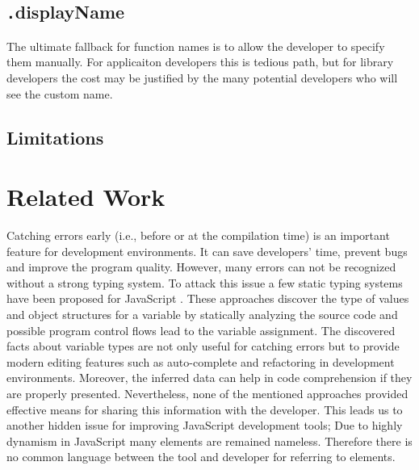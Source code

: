 \documentclass[10pt, preprint]{sigplanconf}
\begin{document}
{\subsection{ {\texttt .displayName} }
The ultimate fallback for function names is to allow the developer to specify them manually. For applicaiton developers this is tedious path, but for library developers the cost may be justified by the many potential developers who will see the custom name.

\subsection{Limitations}

\section{Related Work}



Catching errors early (i.e., before or at the compilation time) is an important feature for development environments. It can save developers' time, prevent bugs and improve the program quality. However, many errors can not be recognized without a strong typing system. To attack this issue a few static typing systems have been proposed for JavaScript \cite{Anderson, Anderson2, Heidegger, Thiemann}. These approaches discover the type of values and object structures for a variable by statically analyzing the source code and possible program control flows lead to the variable assignment. The discovered facts about variable types are not only useful for catching errors but to provide modern editing features such as auto-complete and refactoring in development environments. Moreover, the inferred data can help in code comprehension if they are properly presented. Nevertheless, none of the mentioned approaches provided effective means for sharing this information with the developer. This leads us to another hidden issue for improving JavaScript development tools; Due to highly dynamism in JavaScript many elements are remained nameless. Therefore there is no common language between the tool and developer for referring to elements.

}
\end{document}

